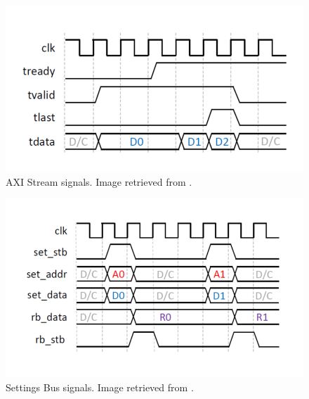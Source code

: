 \documentclass{article}
\begin{document}
\begin{figure}[h]
  \begin{center}
    \centerline{\includegraphics[width=\columnwidth]{axis.png}}
    \caption{AXI Stream signals. Image retrieved from \cite{rfnockb}.}
    \label{axis}
  \end{center}
\end{figure}

\begin{figure}[h]
  \begin{center}
    \centerline{\includegraphics[width=\columnwidth]{settings.png}}
    \caption{Settings Bus signals. Image retrieved from \cite{rfnockb}.}
    \label{settings}
  \end{center}
\end{figure}
\end{document}
